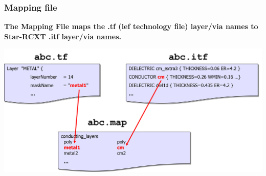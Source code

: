 \documentclass[compress]{beamer}
\begin{document}
\begin{frame}
	\frametitle{Mapping file}
	\textbf{The Mapping File maps the .tf (lef technology file) layer/via names to Star-RCXT .itf layer/via names.}
	
	\begin{center}
		\includegraphics[width=\textwidth]{MAP}
	\end{center}
\end{frame}
\end{document}
